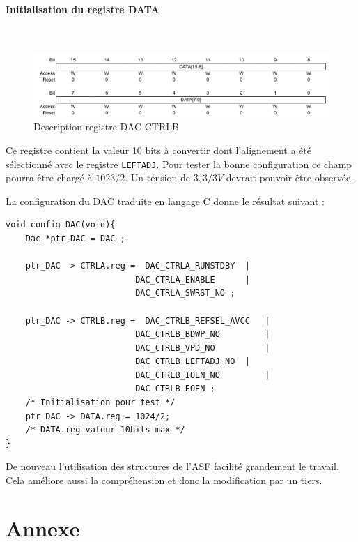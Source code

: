 \documentclass[a4paper]{article}
\begin{document}
\paragraph{Initialisation  du registre DATA} ~~\\
\begin{figure}[H]
	\centering
	\includegraphics[width=12cm]{DATA}
	\caption{Description registre DAC CTRLB}
\end{figure}
Ce registre contient la valeur 10 bits à convertir dont l'alignement a été sélectionné avec le registre \texttt{LEFTADJ}. Pour tester la bonne configuration ce champ pourra être chargé à $1023/2$. Un tension de $3,3/3V$ devrait pouvoir être observée. 

\newpage

La configuration du DAC traduite en langage C donne le résultat suivant :
\begin{lstlisting}[style=CStyle]
void config_DAC(void){
	Dac *ptr_DAC = DAC ;
	
	ptr_DAC -> CTRLA.reg = 	DAC_CTRLA_RUNSTDBY 	|
                          DAC_CTRLA_ENABLE 		|
                          DAC_CTRLA_SWRST_NO ;
	
	ptr_DAC -> CTRLB.reg = 	DAC_CTRLB_REFSEL_AVCC	|
                          DAC_CTRLB_BDWP_NO			|
                          DAC_CTRLB_VPD_NO			|
                          DAC_CTRLB_LEFTADJ_NO  |
                          DAC_CTRLB_IOEN_NO 		|
                          DAC_CTRLB_EOEN ;
	/* Initialisation pour test */
	ptr_DAC -> DATA.reg = 1024/2;
	/* DATA.reg valeur 10bits max */
}
\end{lstlisting}
De nouveau l'utilisation des structures de l'ASF facilité grandement le travail. Cela améliore aussi la compréhension et donc la modification par un tiers.  


	\newpage
	
	{}
	
	
	\newpage
	
	\section{Annexe}
	
\end{document}
